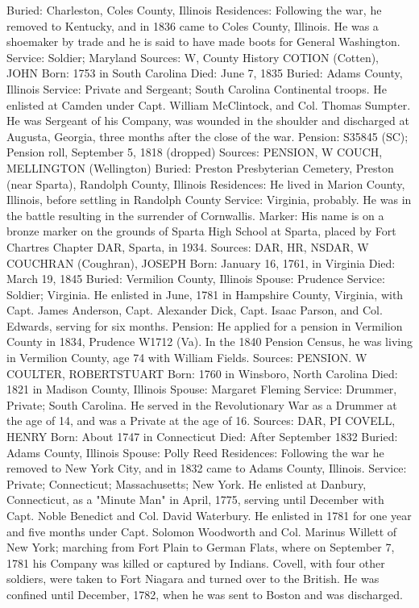 Buried: Charleston, Coles County, Illinois 
Residences: Following the war, he removed to Kentucky, and in 1836 came to Coles County, Illinois. He was a shoemaker by trade and he is said to have made boots for General Washington. 
Service: Soldier; Maryland 
Sources: W, County History 
COTION (Cotten), JOHN 
Born: 1753 in South Carolina 
Died: June 7, 1835 
Buried: Adams County, Illinois 
Service: Private and Sergeant; South Carolina Continental troops. He enlisted at Camden under Capt. William McClintock, and Col. Thomas Sumpter. He was Sergeant of his Company, was wounded in the shoulder and discharged at Augusta, Georgia, three months after the close of the war. 
Pension: S35845 (SC); Pension roll, September 5, 1818 (dropped) 
Sources: PENSION, W 
COUCH, MELLINGTON (Wellington) 
Buried: Preston Presbyterian Cemetery, Preston (near Sparta), Randolph County, Illinois 
Residences: He lived in Marion County, Illinois, before settling in Randolph County 
Service: Virginia, probably. He was in the battle resulting in the surrender of Cornwallis. 
Marker: His name is on a bronze marker on the grounds of Sparta High School at Sparta, placed by Fort Chartres Chapter DAR, Sparta, in 1934. 
Sources: DAR, HR, NSDAR, W 
COUCHRAN (Coughran), JOSEPH 
Born: January 16, 1761, in Virginia 
Died: March 19, 1845 
Buried: Vermilion County, Illinois 
Spouse: Prudence 
Service: Soldier; Virginia. He enlisted in June, 1781 in Hampshire County, Vir­ginia, with Capt. James Anderson, Capt. Alexander Dick, Capt. Isaac Parson, and Col. Edwards, serving for six months. 
Pension: He applied for a pension in Vermilion County in 1834, Prudence W1712 (Va). In the 1840 Pension Census, he was living in Vermilion County, age 74 with William Fields. 
Sources: PENSION. W 
COULTER, ROBERTSTUART 
Born: 1760 in Winsboro, North Carolina 
Died: 1821 in Madison County, Illinois 
Spouse: Margaret Fleming 
Service: Drummer, Private; South Carolina. He served in the Revolutionary War as a Drummer at the age of 14, and was a Private at the age of 16. 
Sources: DAR, PI 
COVELL, HENRY 
Born: About 1747 in Connecticut 
Died: After September 1832 
Buried: Adams County, Illinois 
Spouse: Polly Reed 
Residences: Following the war he removed to New York City, and in 1832 came to Adams County, Illinois. 
Service: Private; Connecticut; Massachusetts; New York. He enlisted at Danbury, Connecticut, as a "Minute Man" in April, 1775, serving until December with Capt. Noble Benedict and Col. David Waterbury. He enlisted in 1781 for one year and five months under Capt. Solomon Woodworth and Col. Marinus Willett of New York; marching from Fort Plain to German Flats, where on September 7, 1781 his Company was killed or captured by Indians. Covell, with four other soldiers, were taken to Fort Niagara and turned over to the British. He was confined until December, 1782, when he was sent to Boston and was discharged. 
